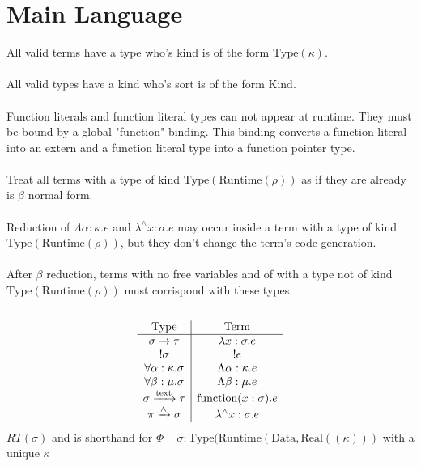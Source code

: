 \documentclass {article}
\begin{document}
\tableofcontents


\section{Main Language}

All valid terms have a type who's kind is of the form $ \text{Type} (\kappa) $. \\
\\
All valid types have a kind who's sort is of the form $ \text{Kind} $.\\
\\
Function literals and function literal types can not appear at runtime. They must be bound by a global "function" binding.
This binding converts a function literal into an extern and a function literal type into a function pointer type. \\
\\
Treat all terms with a type of kind $ \text{Type} (\text{Runtime} (\rho)) $ as if they are already is $ \beta $ normal form. \\
\\
Reduction of $ \Lambda \alpha : \kappa. e $ and $ \lambda^\wedge x : \sigma. e $ may occur inside a term with a type of kind $ \text{Type} (\text{Runtime} (\rho)) $, but they don't
change the term's code generation. \\
\\
After $ \beta $ reduction, terms with no free variables and of with a type not of kind $ \text{Type} (\text{Runtime} (\rho) ) $ must corrispond with these types. \\
\\

\begin{gather*}
\begin{array}{c | c}
\text{Type} & \text{Term} \\
\hline
\sigma \to \tau & \lambda x : \sigma. e \\
!\sigma & !e \\
\forall \alpha : \kappa. \sigma & \Lambda \alpha : \kappa. e  \\
\forall \beta : \mu. \sigma & \Lambda \beta : \mu. e \\
\sigma \xrightarrow{\text{text}} \tau & \text{function}(x : \sigma). e \\
\pi \xrightarrow{\wedge} \sigma & \lambda^\wedge x : \sigma. e
\end{array}
\\
\end{gather*}
$ RT (\sigma) $ and is shorthand for $ \Phi \vdash \sigma : \text{Type} (\text{Runtime} (\text{Data}, \text{Real} ((\kappa))) $ with a unique $ \kappa $ \\
\end{document}
